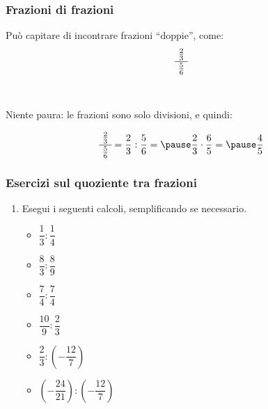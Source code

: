 \documentclass[]{beamer}
\theoremstyle{plain}
\begin{document}
\begin{frame}
\frametitle{Frazioni di frazioni}
Può capitare di incontrare frazioni ``doppie'', come:
\[ \cfrac{~\frac{2}{3}~}{\frac{5}{6}} \]\pause

~

Niente paura: le frazioni sono solo divisioni, e quindi:
  
\[ \cfrac{~\frac{2}{3}~}{\frac{5}{6}} = \frac{2}{3} : \frac{5}{6} = \pause \frac{2}{3} \cdot \frac{6}{5} =\pause \frac{4}{5} \]
\end{frame}



\begin{frame}
\frametitle{Esercizi sul quoziente tra frazioni}
\begin{enumerate}
  \item Esegui i seguenti calcoli, semplificando se necessario.
  \begin{multicols}{2}
    \begin{itemize}
        \item $ \dfrac{1}{3} : \dfrac{1}{4} $
        
        \vspace*{.5cm}
        \item $ \dfrac{8}{3} : \dfrac{8}{9} $
        
        \vspace*{.5cm}
        \item $ \dfrac{7}{4} : \dfrac{7}{4} $
        \item $ \dfrac{10}{9} : \dfrac{2}{3} $
        
        \vspace*{.5cm}
        \item $ \dfrac{2}{3} : \left(-\dfrac{12}{7} \right)$
        
        \vspace*{.5cm}
        \item $ \left(-\dfrac{24}{21}\right) : \left(-\dfrac{12}{7}\right)  $
    \end{itemize}
  \end{multicols}
\end{enumerate}
\end{frame}
\end{document}
